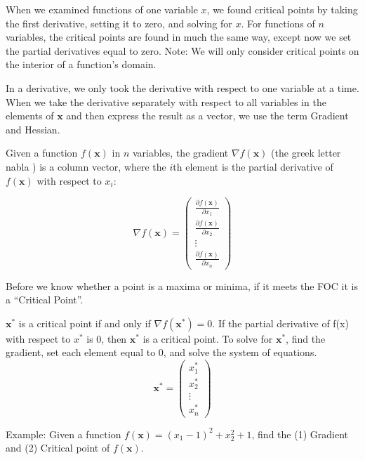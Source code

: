 \documentclass[]{book}
\theoremstyle{definition}
\theoremstyle{definition}
\theoremstyle{definition}
\theoremstyle{remark}
\let\BeginKnitrBlock\begin \let\EndKnitrBlock\end
\begin{document}
When we examined functions of one variable \(x\), we found critical points by taking the first derivative, setting it to zero, and solving for \(x\). For functions of \(n\) variables, the critical points are found in much the same way, except now we set the partial derivatives equal to zero. Note: We will only consider critical points on the interior of a function's domain.

In a derivative, we only took the derivative with respect to one variable at a time. When we take the derivative separately with respect to all variables in the elements of \(\mathbf{x}\) and then express the result as a vector, we use the term Gradient and Hessian.

\BeginKnitrBlock{definition}[Gradient]
\protect\hypertarget{def:unnamed-chunk-52}{}{\label{def:unnamed-chunk-52} {} }
Given a function \(f(\textbf{x})\) in \(n\) variables, the gradient \(\nabla f(\mathbf{x})\) (the greek letter nabla ) is a column vector, where the \(i\)th element is the partial derivative of \(f(\textbf{x})\) with respect to \(x_i\):

\[\nabla f(\mathbf{x}) = \begin{pmatrix}
\frac{\partial f(\mathbf{x})}{\partial x_1}\\ \frac{\partial f(\mathbf{x})}{\partial x_2}\\
  \vdots \\ \frac{\partial f(\mathbf{x})}{\partial x_n} \end{pmatrix}\]
\EndKnitrBlock{definition}

Before we know whether a point is a maxima or minima, if it meets the FOC it is a ``Critical Point''.

\BeginKnitrBlock{definition}[Critical Point]
\protect\hypertarget{def:unnamed-chunk-53}{}{\label{def:unnamed-chunk-53} {} }
\(\mathbf{x}^*\) is a critical point if and only if \(\nabla f(\mathbf{x}^*)=0\). If the partial derivative of f(x) with respect to \(x^*\) is 0, then \(\mathbf{x}^*\) is a critical point. To solve for \(\mathbf{x}^*\), find the gradient, set each element equal to 0, and solve the system of equations. \[\mathbf{x}^* = \begin{pmatrix} x_1^*\\x_2^*\\ \vdots \\ x_n^*\end{pmatrix}\]
\EndKnitrBlock{definition}

\BeginKnitrBlock{example}
\protect\hypertarget{exm:unnamed-chunk-54}{}{\label{exm:unnamed-chunk-54} }
Example: Given a function \(f(\mathbf{x})=(x_1-1)^2+x_2^2+1\), find the (1) Gradient and (2) Critical point of \(f(\mathbf{x})\).
\EndKnitrBlock{example}
\end{document}
